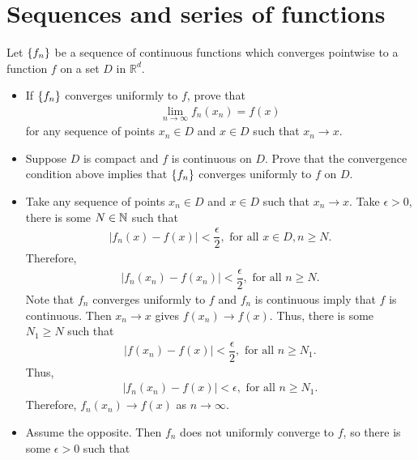 \section{Sequences and series of functions}\label{p:function-sequences}

\begin{problem}
\label{prob:fn-xn}Let $\left\{ f_n\right\}$ be a sequence of continuous functions which converges pointwise to a function $f$ on a set $D$ in $\mathbb{R}^d$.
\begin{itemize}
    \item[(a)] If $\left\{ f_n\right\}$ converges uniformly to $f$, prove that 
    \begin{align*}
        \lim_{n \to \infty} f_n(x_n) = f(x)
    \end{align*}
    for any sequence of points $x_n \in D$ and $x \in D$ such that $x_n \to x$.
    \item[(b)] Suppose $D$ is compact and $f$ is continuous on $D$. Prove that the convergence condition above implies that $\left\{ f_n\right\}$ converges uniformly to $f$ on $D$.
\end{itemize}
\begin{solution}
\begin{itemize}
    \item[(a)] Take any sequence of points $x_n \in D$ and $x \in D$ such that $x_n \to x$. Take $\epsilon > 0$, there is some $N \in \mathbb{N}$ such that 
    \begin{align*}
        |f_n(x) - f(x)| < \dfrac{\epsilon}{2},\text{ for all }x \in D, n \ge N.
    \end{align*}
    Therefore,
    \begin{align*}
        |f_n(x_n) - f(x_n)| < \dfrac{\epsilon}{2},\text{ for all } n \ge N.
    \end{align*}
    Note that $f_n$ converges uniformly to $f$ and $f_n$ is continuous imply that $f$ is continuous. Then $x_n \to x$ gives $f(x_n) \to f(x)$.  Thus, there is some $N_1 \ge N$ such that 
    \begin{align*}
        |f(x_n) - f(x)| < \dfrac{\epsilon}{2},\text{ for all } n \ge N_1.
    \end{align*}
    Thus,
    \begin{align*}
        |f_n(x_n)-f(x)|<\epsilon,\text{ for all }n\ge N_1.
    \end{align*}
    Therefore, $f_n(x_n) \to f(x)$ as $n \to \infty$.
    \item[(b)] Assume the opposite. Then $f_n$ does not uniformly converge to $f$, so there is some $\epsilon > 0$ such that

\end{itemize}
\end{solution}
\end{problem}
